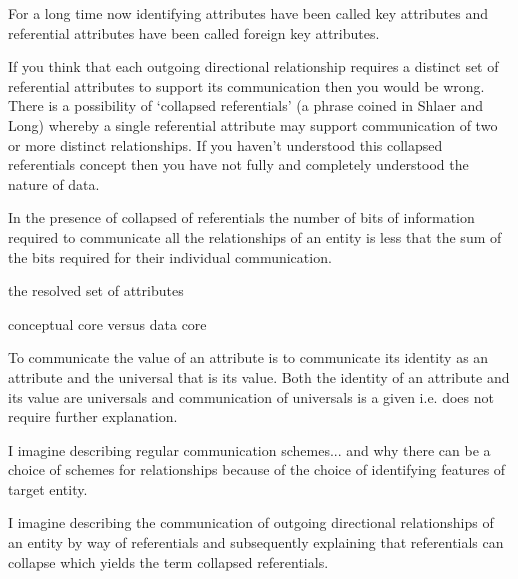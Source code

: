 \mynote For a long time now identifying attributes have been called key attributes and referential attributes have been called foreign key attributes. 

\mynote If you think that each outgoing directional relationship requires a distinct set of referential attributes to support its communication then you would be wrong. 
There is a possibility of `collapsed referentials' (a phrase coined in Shlaer and Long) whereby a single referential attribute may support communication of two or more distinct relationships. If you haven't understood this collapsed referentials concept then you have not  fully and completely understood the nature of data. 

\mynote In the presence of collapsed of referentials the number of bits of information required to communicate all the relationships of an entity is less that the sum of the bits required for their individual communication. 

\mynote the resolved set of attributes

\mynote conceptual core versus data core

\begin{oldtt}
\mynote To communicate the value of an attribute is to communicate its identity as an attribute and the universal that is its value. Both the identity of an attribute and its value are universals and communication of universals is a given i.e. does not require further explanation. 
\end{oldtt}

\begin{noteforfuture}
I imagine describing regular communication schemes... and why there can be a choice of schemes for relationships because of the choice of identifying features of target entity. 
\end{noteforfuture}
\begin{noteforfuture}
I imagine describing the communication of outgoing directional relationships of an entity by way of referentials and subsequently explaining that referentials can collapse which yields the term collapsed referentials.
\end{noteforfuture}